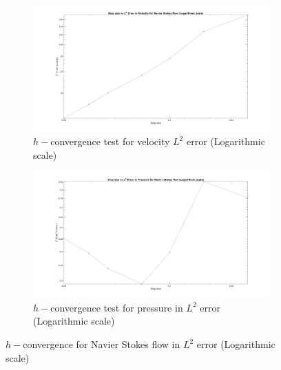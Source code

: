 \documentclass[a4paper,openany]{book}
\begin{document}
\begin{figure}
\begin{subfigure}{\textwidth}	
  \includegraphics[width=\linewidth]{L2_convergence_velocity_n_s_log.jpg}
  \caption{$h-$convergence test for velocity $L^2$ error (Logarithmic scale)}
  \label{fig:vel_naviers_stoke_conv_log}
\end{subfigure}
\begin{subfigure}{\textwidth}	
  \includegraphics[width=\linewidth]{L2_convergence_pressure_n_s_log.jpg}
  \caption{$h-$convergence test for pressure in $L^2$ error (Logarithmic scale)}
  \label{fig:pre_navier_stoke_conv_log}
\end{subfigure}
\caption{$h-$convergence for Navier Stokes flow in $L^2$ error (Logarithmic scale)}
\label{navier_stoke_conv_l2_log}
\end{figure}
\end{document}
